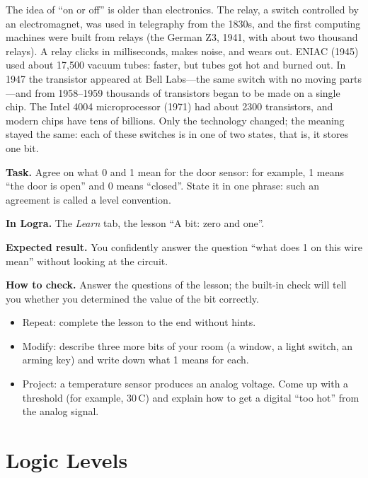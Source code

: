 \begin{infobox}
The idea of ``on or off'' is older than electronics. The relay, a switch
controlled by an electromagnet, was used in telegraphy from the 1830s, and the
first computing machines were built from relays (the German Z3, 1941, with
about two thousand relays). A relay clicks in milliseconds, makes noise, and
wears out. ENIAC (1945) used about 17,500 vacuum tubes: faster, but tubes got
hot and burned out. In 1947 the transistor appeared at Bell Labs---the same
switch with no moving parts---and from 1958--1959 thousands of transistors
began to be made on a single chip. The Intel 4004 microprocessor (1971) had
about 2300 transistors, and modern chips have tens of billions. Only the
technology changed; the meaning stayed the same: each of these switches is in
one of two states, that is, it stores one bit.
\end{infobox}

\begin{diybox}
\textbf{Task.} Agree on what 0 and 1 mean for the door sensor: for example,
1 means ``the door is open'' and 0 means ``closed''. State it in one phrase:
such an agreement is called a level convention.\par
\textbf{In Logra.} The \emph{Learn} tab, the lesson ``A bit: zero and
one''.\par
\textbf{Expected result.} You confidently answer the question ``what does 1
on this wire mean'' without looking at the circuit.\par
\textbf{How to check.} Answer the questions of the lesson; the built-in check
will tell you whether you determined the value of the bit correctly.
\begin{itemize}[leftmargin=3.4em,labelwidth=3em,labelsep=0.4em,align=left]
  \item[\stars{1}] Repeat: complete the lesson to the end without hints.
  \item[\stars{2}] Modify: describe three more bits of your room (a window, a
    light switch, an arming key) and write down what 1 means for each.
  \item[\stars{3}] Project: a temperature sensor produces an analog voltage.
    Come up with a threshold (for example, 30\,\textdegree C) and explain how
    to get a digital ``too hot'' from the analog signal.
\end{itemize}
\end{diybox}

\section{Logic Levels}

